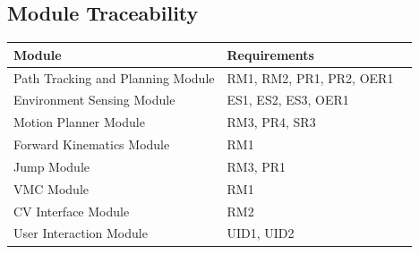 \documentclass[12pt]{article}
\begin{document}
    \subsection{Module Traceability}
        \noindent \begin{tabular}{l l l}
            \toprule
            \textbf{Module}    & \textbf{Requirements} \\
            \midrule
            \hline Path Tracking and Planning Module & RM1, RM2, PR1, PR2, OER1\\
            \hline Environment Sensing Module & ES1, ES2, ES3, OER1\\
            \hline Motion Planner Module & RM3, PR4, SR3\\
            \hline Forward Kinematics Module & RM1\\
            \hline Jump Module & RM3, PR1\\
            \hline VMC Module & RM1\\
            \hline CV Interface Module & RM2\\
            \hline User Interaction Module & UID1, UID2\\
            \bottomrule
        \end{tabular}
\end{document}
